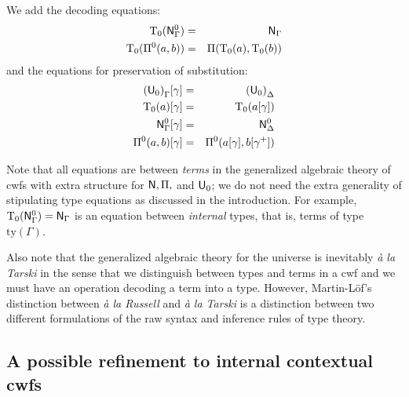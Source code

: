 \documentclass{mscs}
\newcommand{\Ta}{\mathrm{T}}
\newcommand{\ty}{\mathrm{ty}}
\begin{document}
We add the decoding equations:
\begin{eqnarray*}
\Ta_0(\N^0_\Gamma) &=& \N_\Gamma\\
\Ta_0(\Pi^0(a,b)) &=& \Pi(\Ta_0(a),\Ta_0(b))
\end{eqnarray*}
and the equations for preservation of substitution:
\begin{eqnarray*}
{(\U_0)}_\Gamma [ \gamma ] &=& {(\U_0)}_\Delta\\
\Ta_0(a) [ \gamma ] &=& \Ta_0(a[ \gamma ] )\\
\N^0_\Gamma [ \gamma ] &=&\N^0_\Delta\\
\Pi^0(a,b)[ \gamma ] &=& \Pi^0(a [ \gamma ], b[ \gamma^+ ])
\end{eqnarray*}

\begin{remark}\label{remark:typeequations}
Note that all equations are between {\em terms} in the generalized algebraic theory of cwfs with extra structure for $\mathsf{N}, \Pi,$ and $\mathsf{U}_0$; we do not need the extra generality of stipulating type equations as discussed in the introduction. For example, $\Ta_0(\N^0_\Gamma) = \N_\Gamma$ is an equation between {\em internal} types, that is, terms of type $\ty(\Gamma)$.
\end{remark}

\begin{remark}
Also note that the generalized algebraic theory for the universe is inevitably {\em \`a la Tarski} in the sense that we distinguish between types and terms in a cwf and we must have an operation decoding a term into a type. However, Martin-Löf's distinction between {\em \`a la Russell} and {\em \`a la Tarski} \cite{martinlof:padova} is a distinction between two different formulations of the raw syntax and inference rules of type theory.
\end{remark}

\subsection{A possible refinement to internal contextual cwfs}
\end{document}
